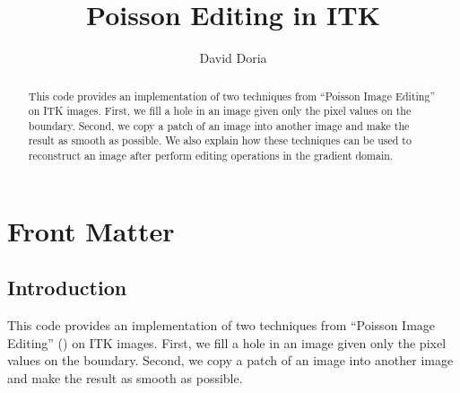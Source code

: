 \documentclass{InsightArticle}
\title{Poisson Editing in ITK}
\author{David Doria}
\newcommand{\IJhandlerIDnumber}{3253}
\begin{document}
%
% 
\IJhandlefooter{\IJhandlerIDnumber}


\ifpdf
\else
\fi


\maketitle


\ifhtml
\chapter*{Front Matter\label{front}}
\fi


\begin{abstract}
\noindent
This code provides an implementation of two techniques from ``Poisson Image Editing'' on ITK images. First, we fill a hole in an image given only the pixel values on the boundary. Second, we copy a patch of an image into another image and make the result as smooth as possible. We also explain how these techniques can be used to reconstruct an image after perform editing operations in the gradient domain.

\end{abstract}

\IJhandlenote{\IJhandlerIDnumber}

\tableofcontents

\section{Introduction}
This code provides an implementation of two techniques from ``Poisson Image Editing'' (\cite{PoissonImageEditing}) on ITK images. First, we fill a hole in an image given only the pixel values on the boundary. Second, we copy a patch of an image into another image and make the result as smooth as possible.
\end{document}
